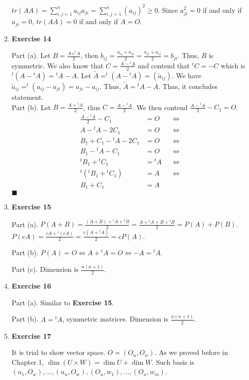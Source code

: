 \documentclass[11pt]{article}
\begin{document}
\begin{enumerate}
\(tr(AA)=\sum\limits_{i,j=1}^n a_{ij}a_{ji}=\sum\limits_{i,j=1}^n (a_{ij})^2\geq 0\).
Since \(a_{ji}^2=0\) if and only if \(a_{ji}=0\), \(tr(AA)=0\) if and only if \(A=O\).
\item \textbf{Exercise 14}
\label{sec:org4ca3273}

Part (a). Let \(B=\frac{A+^tA}{2}\), then \(b_{ij}=\frac{a_{ij}+a_{ji}}{2}=\frac{a_{ji}+a_{ij}}{2}=b_{ji}\). Thus, \(B\) is symmetric. We also know that \(C=\frac{A-{}^tA}{2}\) and contend that \(^tC=-C\) which is \(^t(A-{}^t A)={}^tA-A\). Let \(\tilde{A}=^t(A-{}^t A)=(\tilde{a}_{ij})\). We have \(\tilde{a}_{ij}=^t(a_{ij}-a_{ji})=a_{ji}-a_{ij}\). Thus, \(\tilde{A}={}^tA-A\). Thus, it concludes statement.\\

Part (b).
Let \(B=\frac{A+{}^tA}{2}\), thus \(C=\frac{A-{}^tA}{2}\). We then contend \(\frac{A-{}^tA}{2}-C_1=O\).
$$\begin{aligned}
\frac{A-{}^tA}{2}-C_1&=O &&\Leftrightarrow\\
A-{}^tA-2C_1&=O &&\Leftrightarrow\\
B_1+C_1-{}^tA-2C_1&=O &&\Leftrightarrow\\
B_1-{}^tA-C_1&=O &&\Leftrightarrow\\
^tB_1 +{}^tC_1 &={}^tA &&\Leftrightarrow\\
^t({}^tB_1+{}^tC_1)&=A &&\Leftrightarrow\\
B_1+C_1&=A
\end{aligned}$$
\(\blacksquare\)
\item \textbf{Exercise 15}
\label{sec:org2130fa3}

Part (a). \(P(A+B)=\frac{(A+B)+{}^tA+{}^tB}{2}=\frac{A+{}^tA+B+{}^tB}{2}=P(A)+P(B)\). \(P(cA)=\frac{cA+{}^t(cA)}{2}=\frac{c(A+{}^tA)}{2}=cP(A)\).

Part (b).
\(P(A)=O \Leftrightarrow A+{}^tA=O \Leftrightarrow -A={}^tA\).

Part (c).
Dimension is \(\frac{n(n+1)}{2}\).
\item \textbf{Exercise 16}
\label{sec:orga2f7d15}

Part (a). Similar to \textbf{Exercise 15}.

Part (b). \(A={}^tA\), symmetric matrices. Dimension is \(\frac{n(n+1)}{2}\).
\item \textbf{Exercise 17}
\label{sec:org7e3133f}

It is trial to show vector space. \(O=(O_u,O_w)\).
As we proved before in Chapter 1, \(\dim (U\times W)=\dim U+ \dim W\). Such basis is \((u_1,O_w),\dots ,(u_n,O_w),(O_u,w_1),\dots ,(O_u,w_m)\).
\end{enumerate}
\end{document}
